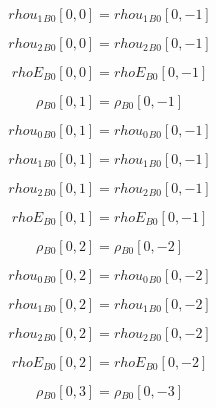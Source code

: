 \documentclass{article}
\begin{document}
\begin{dmath}{rhou_{1}{_{B0}}}[{0,0}] = {rhou_{1}{_{B0}}}[{0,-1}]\end{dmath}

\begin{dmath}{rhou_{2}{_{B0}}}[{0,0}] = {rhou_{2}{_{B0}}}[{0,-1}]\end{dmath}

\begin{dmath}{rhoE{_{B0}}}[{0,0}] = {rhoE{_{B0}}}[{0,-1}]\end{dmath}

\begin{dmath}{\rho{_{B0}}}[{0,1}] = {\rho{_{B0}}}[{0,-1}]\end{dmath}

\begin{dmath}{rhou_{0}{_{B0}}}[{0,1}] = {rhou_{0}{_{B0}}}[{0,-1}]\end{dmath}

\begin{dmath}{rhou_{1}{_{B0}}}[{0,1}] = {rhou_{1}{_{B0}}}[{0,-1}]\end{dmath}

\begin{dmath}{rhou_{2}{_{B0}}}[{0,1}] = {rhou_{2}{_{B0}}}[{0,-1}]\end{dmath}

\begin{dmath}{rhoE{_{B0}}}[{0,1}] = {rhoE{_{B0}}}[{0,-1}]\end{dmath}

\begin{dmath}{\rho{_{B0}}}[{0,2}] = {\rho{_{B0}}}[{0,-2}]\end{dmath}

\begin{dmath}{rhou_{0}{_{B0}}}[{0,2}] = {rhou_{0}{_{B0}}}[{0,-2}]\end{dmath}

\begin{dmath}{rhou_{1}{_{B0}}}[{0,2}] = {rhou_{1}{_{B0}}}[{0,-2}]\end{dmath}

\begin{dmath}{rhou_{2}{_{B0}}}[{0,2}] = {rhou_{2}{_{B0}}}[{0,-2}]\end{dmath}

\begin{dmath}{rhoE{_{B0}}}[{0,2}] = {rhoE{_{B0}}}[{0,-2}]\end{dmath}

\begin{dmath}{\rho{_{B0}}}[{0,3}] = {\rho{_{B0}}}[{0,-3}]\end{dmath}
\end{document}

